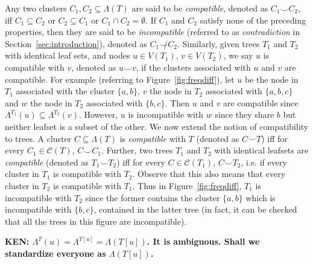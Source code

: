 \documentclass[final,1p,times]{elsarticle}
\newcommand{\compatible}{\smile}
\newcommand{\leafset}{\Lambda}
\begin{document}
    Any two clusters $C_1, C_2 \subseteq \leafset(T)$ are said to be \textit{compatible}, denoted as $C_1 \compatible C_2$, iff $C_1 \subseteq C_2$ or $C_2 \subseteq C_1$ or $C_1 \cap C_2 = \emptyset$. If $C_1$ and $C_2$ satisfy none of the preceding properties, then they are said to be \textit{incompatible} (referred to as \textit{contradiction} in Section~\ref{sec:introduction}), denoted as $C_1 \not\compatible C_2$. Similarly, given trees $T_1$ and $T_2$ with identical leaf sets, and nodes $u \in V(T_1)$, $v \in V(T_2)$, we say $u$ is compatible with $v$, denoted as $u \compatible v$, if the clusters associated with $u$ and $v$ are compatible. For example (referring to Figure~\ref{fig:freqdiff}), let $u$ be the node in $T_1$ associated with the cluster $\{a, b\}$, $v$ the node in $T_2$ associated with $\{a, b, c\}$ and $w$ the node in $T_2$ associated with $\{b, c\}$. Then $u$ and $v$ are compatible since $\leafset^{T_1}(u) \subseteq \leafset^{T_2}(v)$. However, $u$ is incompatible with $w$ since they share $b$ but neither leafset is a subset of the other. We now extend the notion of compatibility to trees. A cluster $C \subseteq \leafset(T)$ is \textit{compatible} with $T$ (denoted as $C \compatible T$) iff for every $C_1 \in \mathcal{C}(T)$, $C \compatible C_1$. Further, two trees $T_1$ and $T_2$ with identical leafsets are \textit{compatible} (denoted as $T_1 \compatible T_2$) iff for every $C \in \mathcal{C}(T_1)$, $C \compatible T_2$, i.e. if every cluster in $T_1$ is compatible with $T_2$. Observe that this also means that every cluster in $T_2$ is compatible with $T_1$. Thus in Figure~\ref{fig:freqdiff}, $T_1$ is incompatible with $T_2$ since the former contains the cluster $\{a, b\}$ which is incompatible with $\{b, c\}$, contained in the latter tree (in fact, it can be checked that all the trees in this figure are incompatible).

    {\bf KEN: $\leafset^T(u) = \leafset^{T[u]} = \leafset(T[u])$. It is ambiguous. Shall we standardize everyone as $\leafset(T[u])$.}
\end{document}
